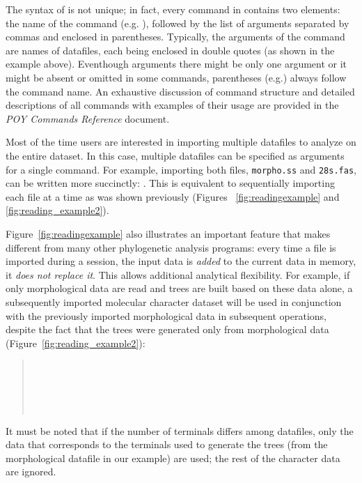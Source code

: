 The syntax of  is not unique; in fact, every command in \poyv contains two elements: the name of the command (e.g. ), followed by the list of arguments 
separated by commas and enclosed in parentheses. Typically, the arguments of the command  are names of datafiles, each being enclosed in double quotes (as shown in the example above). Eventhough arguments there might be only one argument or it might be absent or omitted in some commands, parentheses (e.g.) always follow the command name. An exhaustive discussion of \poy command structure and detailed descriptions of all commands with examples of their usage are provided in the \emph{POY Commands Reference} document.

Most of the time users are interested in importing multiple datafiles to analyze on the entire dataset. In this case, multiple datafiles can be specified as arguments for a single command. For example, importing both files, \texttt{morpho.ss} and \texttt{28s.fas}, can be written more succinctly:
. This is equivalent to sequentially importing each file at a time as was shown previously (Figures ~\ref{fig:readingexample} and \ref{fig:reading_example2}).

Figure~\ref{fig:readingexample} also illustrates an important feature that makes \poy
different from many other phylogenetic analysis programs: every
time a file is imported during a \poy session, the input data is \emph{added} to the current data in memory, it \emph{does not replace it}. This allows additional analytical flexibility. For example, if only morphological data are read and trees are built based on these data alone, a subsequently imported molecular character dataset will be used in conjunction with the previously imported morphological data in subsequent operations, despite the fact that the trees were generated only from morphological data (Figure~\ref{fig:reading_example2}):

\begin{quote}
\\
\\
\\
\\
\end{quote}

It must be noted that if the number of terminals differs among datafiles, only the data that corresponds to the terminals used to generate the trees (from the morphological datafile in our example) are used; the rest of the character data are ignored.

